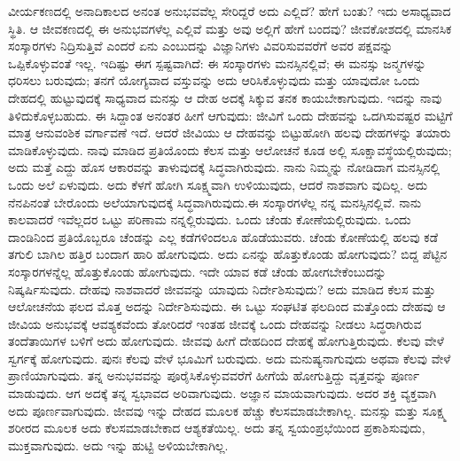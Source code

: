 ವೀರ್ಯಕಣದಲ್ಲಿ ಅನಾದಿಕಾಲದ ಅನಂತ ಅನುಭವವೆಲ್ಲ ಸೇರಿದ್ದರೆ ಅದು ಎಲ್ಲಿದೆ? ಹೇಗೆ ಬಂತು? ಇದು ಅಸಾಧ್ಯವಾದ ಸ್ಥಿತಿ. ಆ ಜೀವಕಣದಲ್ಲಿ ಈ ಅನುಭವಗಳೆಲ್ಲ ಎಲ್ಲಿವೆ ಮತ್ತು ಅವು ಅಲ್ಲಿಗೆ ಹೇಗೆ ಬಂದವು? ಜೀವಕೋಶದಲ್ಲಿ ಮಾನಸಿಕ ಸಂಸ್ಕಾರಗಳು ನಿದ್ರಿಸುತ್ತಿವೆ ಎಂದರೆ ಏನು ಎಂಬುದನ್ನು ವಿಜ್ಞಾನಿಗಳು ವಿವರಿಸುವವರೆಗೆ ಅವರ ಪಕ್ಷವನ್ನು ಒಪ್ಪಿಕೊಳ್ಳುವಂತೆ ಇಲ್ಲ. ಇದಿಷ್ಟು ಈಗ ಸ್ಪಷ್ಟವಾಗಿದೆ: ಈ ಸಂಸ್ಕಾರಗಳು ಮನಸ್ಸಿನಲ್ಲಿವೆ; ಈ ಮನಸ್ಸು ಜನ್ಮಗಳನ್ನು ಧರಿಸಲು ಬರುವುದು; ತನಗೆ ಯೋಗ್ಯವಾದ ವಸ್ತುವನ್ನು ಅದು ಆರಿಸಿಕೊಳ್ಳುವುದು ಮತ್ತು ಯಾವುದೋ ಒಂದು ದೇಹದಲ್ಲಿ ಹುಟ್ಟುವುದಕ್ಕೆ ಸಾಧ್ಯವಾದ ಮನಸ್ಸು ಆ ದೇಹ ಅದಕ್ಕೆ ಸಿಕ್ಕುವ ತನಕ ಕಾಯಬೇಕಾಗುವುದು. ಇದನ್ನು ನಾವು ತಿಳಿದುಕೊಳ್ಳಬಹುದು. ಈ ಸಿದ್ದಾಂತ ಅನಂತರ ಹೀಗೆ ಆಗುವುದು: ಜೀವಿಗೆ ಒಂದು ದೇಹವನ್ನು ಒದಗಿಸುವಷ್ಟರ ಮಟ್ಟಿಗೆ ಮಾತ್ರ ಆನುವಂಶಿಕ ವರ್ಗಾವಣೆ ಇದೆ. ಆದರೆ ಜೀವಿಯು ಆ ದೇಹವನ್ನು ಬಿಟ್ಟುಹೋಗಿ ಹಲವು ದೇಹಗಳನ್ನು ತಯಾರು ಮಾಡಿಕೊಳ್ಳುವುದು. ನಾವು ಮಾಡಿದ ಪ್ರತಿಯೊಂದು ಕೆಲಸ ಮತ್ತು ಆಲೋಚನೆ ಕೂಡ ಅಲ್ಲಿ ಸೂಕ್ಷಾವಸ್ಥೆಯಲ್ಲಿರುವುದು; ಅದು ಮತ್ತೆ ಎದ್ದು ಹೊಸ ಆಕಾರವನ್ನು ತಾಳುವುದಕ್ಕೆ ಸಿದ್ಧವಾಗಿರುವುದು. ನಾನು ನಿಮ್ಮನ್ನು ನೋಡಿದಾಗ ಮನಸ್ಸಿನಲ್ಲಿ ಒಂದು ಅಲೆ ಏಳುವುದು. ಅದು ಕೆಳಗೆ ಹೋಗಿ ಸೂಕ್ಷ್ಮವಾಗಿ ಉಳಿಯುವುದು, ಆದರೆ ನಾಶವಾಗು ವುದಿಲ್ಲ. ಅದು ನೆನಪಿನಂತೆ ಬೇರೊಂದು ಅಲೆಯಾಗುವುದಕ್ಕೆ ಸಿದ್ಧವಾಗಿರುವುದು.ಈ ಸಂಸ್ಕಾರಗಳೆಲ್ಲ ನನ್ನ ಮನಸ್ಸಿನಲ್ಲಿವೆ. ನಾನು ಕಾಲವಾದರೆ ಇವೆಲ್ಲದರ ಒಟ್ಟು ಪರಿಣಾಮ ನನ್ನಲ್ಲಿರುವುದು. ಒಂದು ಚೆಂಡು ಕೋಣೆಯಲ್ಲಿರುವುದು. ಒಂದು ದಾಂಡಿನಿಂದ ಪ್ರತಿಯೊಬ್ಬರೂ ಚೆಂಡನ್ನು ಎಲ್ಲ ಕಡೆಗಳಿಂದಲೂ ಹೊಡೆಯುವರು. ಚೆಂಡು ಕೋಣೆಯಲ್ಲಿ ಹಲವು ಕಡೆ ತಗುಲಿ ಬಾಗಿಲ ಹತ್ತಿರ ಬಂದಾಗ ಹಾರಿ ಹೋಗುವುದು. ಅದು ಏನನ್ನು ಹೊತ್ತುಕೊಂಡು ಹೋಗುವುದು? ಬಿದ್ದ ಪೆಟ್ಟಿನ ಸಂಸ್ಕಾರಗಳನ್ನೆಲ್ಲ ಹೊತ್ತುಕೊಂಡು ಹೋಗುವುದು. ಇದೇ ಯಾವ ಕಡೆ ಚೆಂಡು ಹೋಗಬೇಕೆಂಬುದನ್ನು ನಿಷ್ಕರ್ಷಿಸುವುದು. ದೇಹವು ನಾಶವಾದರೆ ಜೀವವನ್ನು ಯಾವುದು ನಿರ್ದೇಶಿಸುವುದು? ಅದು ಮಾಡಿದ ಕೆಲಸ ಮತ್ತು ಆಲೋಚನೆಯ ಫಲದ ಮೊತ್ತ ಅದನ್ನು ನಿರ್ದೇಶಿಸುವುದು. ಈ ಒಟ್ಟು ಸಂಘಟಿತ ಫಲದಿಂದ ಮತ್ತೊಂದು ದೇಹವು ಆ ಜೀವಿಯ ಅನುಭವಕ್ಕೆ ಆವಶ್ಯಕವೆಂದು ತೋರಿದರೆ ಇಂತಹ ಜೀವಕ್ಕೆ ಒಂದು ದೇಹವನ್ನು ನೀಡಲು ಸಿದ್ಧರಾಗಿರುವ ತಂದೆತಾಯಿಗಳ ಬಳಿಗೆ ಅದು ಹೋಗುವುದು. ಜೀವವು ಹೀಗೆ ದೇಹದಿಂದ ದೇಹಕ್ಕೆ ಹೋಗುತ್ತಿರುವುದು. ಕೆಲವು ವೇಳೆ ಸ್ವರ್ಗಕ್ಕೆ ಹೋಗುವುದು. ಪುನಃ ಕೆಲವು ವೇಳೆ ಭೂಮಿಗೆ ಬರುವುದು. ಅದು ಮನುಷ್ಯನಾಗುವುದು ಅಥವಾ ಕೆಲವು ವೇಳೆ ಪ್ರಾಣಿಯಾಗುವುದು. ತನ್ನ ಅನುಭವವನ್ನು ಪೂರೈಸಿಕೊಳ್ಳುವವರೆಗೆ ಹೀಗೆಯೆ ಹೋಗುತ್ತಿದ್ದು ವೃತ್ತವನ್ನು ಪೂರ್ಣ ಮಾಡುವುದು. ಆಗ ಅದಕ್ಕೆ ತನ್ನ ಸ್ವಭಾವದ ಅರಿವಾಗುವುದು. ಅಜ್ಞಾನ ಮಾಯವಾಗುವುದು. ಅದರ ಶಕ್ತಿ ವ್ಯಕ್ತವಾಗಿ ಅದು ಪೂರ್ಣವಾಗುವುದು. ಜೀವವು ಇನ್ನು ದೇಹದ ಮೂಲಕ ಹೆಚ್ಚು ಕೆಲಸಮಾಡಬೇಕಾಗಿಲ್ಲ. ಮನಸ್ಸು ಮತ್ತು ಸೂಕ್ಷ್ಮ ಶರೀರದ ಮೂಲಕ ಅದು ಕೆಲಸಮಾಡಬೇಕಾದ ಆಶ್ಯಕತೆಯಿಲ್ಲ. ಅದು ತನ್ನ ಸ್ವಯಂಪ್ರಭೆಯಿಂದ ಪ್ರಕಾಶಿಸುವುದು, ಮುಕ್ತವಾಗುವುದು. ಅದು ಇನ್ನು ಹುಟ್ಟಿ ಅಳಿಯಬೇಕಾಗಿಲ್ಲ.

